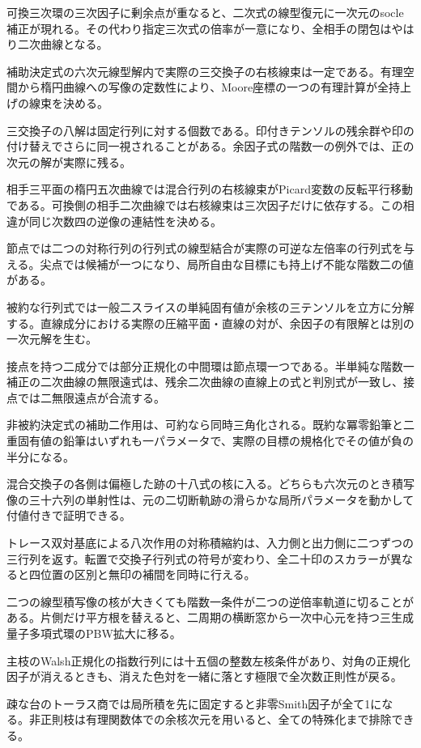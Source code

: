 \documentclass[11pt,a4paper]{ltjsarticle}
\begin{document}
可換三次環の三次因子に剰余点が重なると、二次式の線型復元に一次元のsocle補正が現れる。その代わり指定三次式の倍率が一意になり、全相手の閉包はやはり二次曲線となる。

補助決定式の六次元線型解内で実際の三交換子の右核線束は一定である。有理空間から楕円曲線への写像の定数性により、Moore座標の一つの有理計算が全持上げの線束を決める。

三交換子の八解は固定行列に対する個数である。印付きテンソルの残余群や印の付け替えでさらに同一視されることがある。余因子式の階数一の例外では、正の次元の解が実際に残る。

相手三平面の楕円五次曲線では混合行列の右核線束がPicard変数の反転平行移動である。可換側の相手二次曲線では右核線束は三次因子だけに依存する。この相違が同じ次数四の逆像の連結性を決める。

節点では二つの対称行列の行列式の線型結合が実際の可逆な左倍率の行列式を与える。尖点では候補が一つになり、局所自由な目標にも持上げ不能な階数二の値がある。

被約な行列式では一般二スライスの単純固有値が余核の三テンソルを立方に分解する。直線成分における実際の圧縮平面・直線の対が、余因子の有限解とは別の一次元解を生む。

接点を持つ二成分では部分正規化の中間環は節点環一つである。半単純な階数一補正の二次曲線の無限遠式は、残余二次曲線の直線上の式と判別式が一致し、接点では二無限遠点が合流する。

非被約決定式の補助二作用は、可約なら同時三角化される。既約な冪零鉛筆と二重固有値の鉛筆はいずれも一パラメータで、実際の目標の規格化でその値が負の半分になる。

混合交換子の各側は偏極した跡の十八式の核に入る。どちらも六次元のとき積写像の三十六列の単射性は、元の二切断軌跡の滑らかな局所パラメータを動かして付値付きで証明できる。

トレース双対基底による八次作用の対称積縮約は、入力側と出力側に二つずつの三行列を返す。転置で交換子行列式の符号が変わり、全二十印のスカラーが異なると四位置の区別と無印の補間を同時に行える。

二つの線型積写像の核が大きくても階数一条件が二つの逆倍率軌道に切ることがある。片側だけ平方根を替えると、二周期の横断窓から一次中心元を持つ三生成量子多項式環のPBW拡大に移る。

主枝のWalsh正規化の指数行列には十五個の整数左核条件があり、対角の正規化因子が消えるときも、消えた色対を一緒に落とす極限で全次数正則性が戻る。

疎な台のトーラス商では局所積を先に固定すると非零Smith因子が全て1になる。非正則枝は有理関数体での余核次元を用いると、全ての特殊化まで排除できる。
\end{document}
